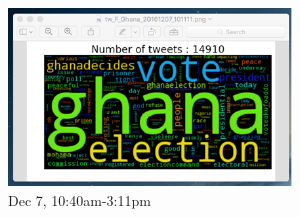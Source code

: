 \documentclass[12pt,notitlepage]{article}
\begin{document}
\begin{figure}[htb]
	\centering
	\begin{minipage}[b]{0.4\textwidth}
		\includegraphics[width=\textwidth]{WordCloudAnalystGana_3.pdf}
		\caption{Dec 7, 10:40am-3:11pm}
		\label{fig:WordCloudAnalystGana_3}
	\end{minipage}
	\begin{minipage}[b]{0.15\textwidth}

\end{minipage}
\end{figure}
\end{document}
